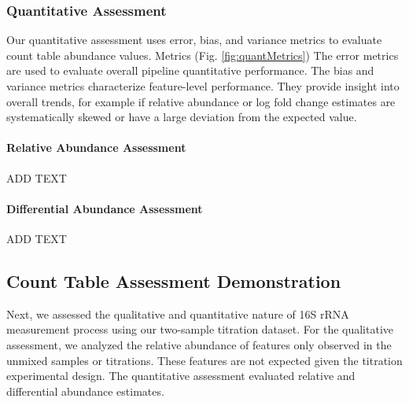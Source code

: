 \documentclass[linenumbers]{bmcart}
\begin{document}
\subsubsection*{Quantitative Assessment}
Our quantitative assessment uses error, bias, and variance metrics to evaluate count table abundance values.
Metrics (Fig. \ref{fig:quantMetrics})
The error metrics are used to evaluate overall pipeline quantitative performance.
The bias and variance metrics characterize feature-level performance.
They provide insight into overall trends, for example if relative abundance or log fold change estimates are systematically skewed or have a large deviation from the expected value.

\paragraph*{Relative Abundance Assessment}
ADD TEXT

\paragraph*{Differential Abundance Assessment}
ADD TEXT

\subsection*{Count Table Assessment Demonstration}
Next, we assessed the qualitative and quantitative nature of 16S rRNA
measurement process using our two-sample titration dataset. For the
qualitative assessment, we analyzed the relative abundance of features
only observed in the unmixed samples or titrations. These features are
not expected given the titration experimental design. The quantitative
assessment evaluated relative and differential abundance estimates.
\end{document}
